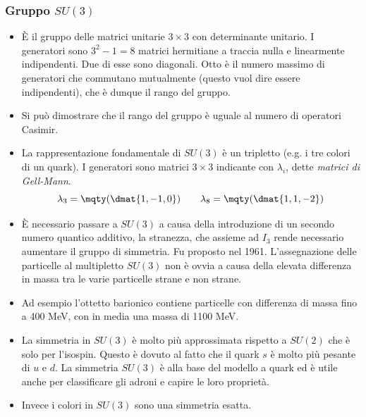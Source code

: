 \subsubsection{Gruppo $SU(3)$}
\begin{itemize}
    \item È il gruppo delle matrici unitarie $3\times3$ con determinante unitario. I generatori sono $3^2-1=8$ matrici hermitiane a traccia nulla e linearmente indipendenti. Due di esse sono diagonali. Otto è il numero massimo di generatori che commutano mutualmente (questo vuol dire essere indipendenti), che è dunque il rango del gruppo.
    \item Si può dimostrare che il rango del gruppo è uguale al numero di operatori Casimir.
    \item La rappresentazione fondamentale di $SU(3)$ è un tripletto (e.g. i tre colori di un quark). I generatori sono matrici $3\times3$ indicante con $\lambda_i$, dette \textit{matrici di Gell-Mann}.
    \begin{equation*}
    \lambda_3=\mqty(\dmat{1,-1,0})\qquad \lambda_8=\mqty(\dmat{1,1,-2})
    \end{equation*}
    \item È necessario passare a $SU(3)$ a causa della introduzione di un secondo numero quantico additivo, la stranezza, che assieme ad $I_3$ rende necessario aumentare il gruppo di simmetria. Fu proposto nel 1961. L'assegnazione delle particelle al multipletto $SU(3)$ non è ovvia a causa della elevata differenza in massa tra le varie particelle strane e non strane. 
    \item Ad esempio l'ottetto barionico contiene particelle con differenza di massa fino a 400 MeV, con in media una massa di 1100 MeV.
    \item La simmetria in $SU(3)$ è molto più approssimata rispetto a $SU(2)$ che è solo per l'isospin. Questo è dovuto al fatto che il quark $s$ è molto più pesante di $u$ e $d$. La simmetria $SU(3)$ è alla base del modello a quark ed è utile anche per classificare gli adroni e capire le loro proprietà. 
    \item Invece i colori in $SU(3)$ sono una simmetria esatta.
\end{itemize}
